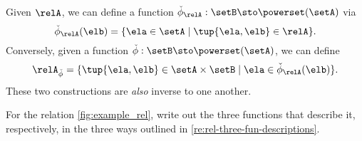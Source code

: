 \begin{remark}
\begin{enumerate}
Given $\relA$, we can define a function $\check \phi_{\relA} : \setB \sto \powerset (\setA)$ via 
\begin{equation}
\check \phi_{\relA} (\elb) = \{ \ela \in \setA \mid \tup{\ela, \elb} \in \relA \}. 
\end{equation}
Conversely, given a function $\check \phi : \setB \sto \powerset (\setA)$, we can define 
\begin{equation}
\relA_{\check \phi} = \{ \tup{\ela, \elb} \in \setA \times \setB \mid \ela \in \check \phi_{\relA}(\elb)   \}.
\end{equation}
These two constructions are \emph{also} inverse to one another. 
\end{enumerate}
\end{remark}

\begin{gradedexercise}\label{ex:Rel3Functions}
For the relation \cref{fig:example_rel}, 
write out the three functions that describe it, respectively, in the three ways outlined in \cref{re:rel-three-fun-descriptions}. 
\end{gradedexercise}

